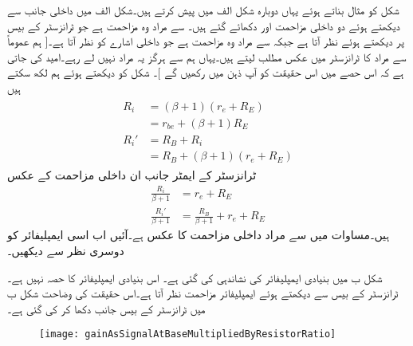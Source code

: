 شکل  کو مثال بناتے ہوئے یہاں دوبارہ شکل  الف میں پیش کرتے ہیں۔شکل  الف   میں داخلی جانب سے دیکھتے ہوئے دو داخلی مزاحمت  اور  دکھائے گئے ہیں۔ سے مراد وہ مزاحمت ہے جو ٹرانزسٹر کے بیس پر دیکھتے ہوئے نظر آتا ہے جبکہ  سے مراد وہ مزاحمت ہے جو داخلی اشارے  کو نظر آتا ہے۔[ ہم عموماً  سے مراد  کا ٹرانزسٹر میں عکس مطلب لیتے ہیں۔یہاں ہم  سے  ہرگز یہ مراد نہیں لے رہے۔امید کی جاتی ہے کہ اس حصے میں اس حقیقت کو آپ ذہن میں رکھیں گے ]۔ شکل کو دیکھتے ہوئے ہم لکھ سکتے ہیں
\begin{gather}
\begin{aligned}\label{مساوات_ٹرانزسٹر_داخلی_مزاحمت_کے_دو_اقسام}
R_i&=\left(\beta+1 \right) \left(r_e+R_E \right)\\
&=r_{be}+\left(\beta+1 \right) R_E\\
R_i'&=R_B+R_i\\
&=R_B+\left(\beta+1 \right) \left(r_e+R_E \right)
\end{aligned}
\end{gather}
ٹرانزسٹر کے ایمٹر جانب ان داخلی مزاحمت  کے عکس
\begin{align*}
\frac{R_i}{\beta+1}&=r_e+R_E\\
\frac{R_i'}{\beta+1}&=\frac{R_B}{\beta+1} +r_e+R_E
\end{align*}
ہیں۔مساوات   میں  سے مراد داخلی مزاحمت  کا عکس ہے۔آئیں اب اسی ایمپلیفائر کو دوسری نظر سے دیکھیں۔

شکل  ب میں بنیادی ایمپلیفائر کی نشاندہی کی گئی ہے۔ اس بنیادی ایمپلیفائر کا حصہ نہیں ہے۔ٹرانزسٹر کے بیس سے دیکھتے ہوئے ایمپلیفائر مزاحمت  نظر آتا ہے۔اس حقیقت کی وضاحت شکل  ب میں ٹرانزسٹر کے بیس جانب  دکھا کر کی گئی ہے۔ 
\begin{figure}
\centering
\texttt{[image: gainAsSignalAtBaseMultipliedByResistorRatio]}
\caption{}
\label{شکل_ٹرانزسٹر_افزائش_کو_داخلی_مزاحمت_کی_مدد_سے}
\end{figure}

